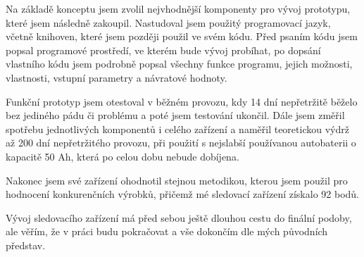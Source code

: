 \documentclass[FM,MP]{tulthesis}  %
\begin{document}
Na základě konceptu jsem zvolil nejvhodnější komponenty pro vývoj prototypu, které jsem následně zakoupil. Nastudoval jsem použitý programovací jazyk, včetně knihoven, které jsem později použil ve svém kódu. Před psaním kódu jsem popsal programové prostředí, ve kterém bude vývoj probíhat, po dopsání vlastního kódu jsem podrobně popsal všechny funkce programu, jejich možnosti, vlastnosti, vstupní parametry a návratové hodnoty. 

Funkční prototyp jsem otestoval v běžném provozu, kdy 14 dní nepřetržitě běželo bez jediného pádu či problému a poté jsem testování ukončil. Dále jsem změřil spotřebu jednotlivých komponentů i celého zařízení a naměřil teoretickou výdrž až 200 dní nepřetržitého provozu, při použití s nejslabší používanou autobaterii o kapacitě 50 Ah, která po celou dobu nebude dobíjena.

Nakonec jsem své zařízení ohodnotil stejnou metodikou, kterou jsem použil pro hodnocení konkurenčních výrobků, přičemž mé sledovací zařízení získalo 92 bodů.

Vývoj sledovacího zařízení má před sebou ještě dlouhou cestu do finální podoby, ale věřím, že v práci budu pokračovat a vše dokončím dle mých původních představ.

\end{document}
